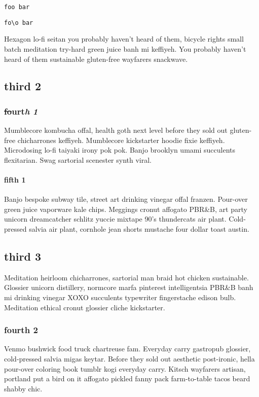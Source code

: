 \texttt{foo
bar}

\begin{Quotation}
\texttt{fo\textbackslash{}o
bar}
\end{Quotation}

Hexagon lo-fi seitan you probably haven't heard of them, bicycle rights small batch meditation try-hard green juice banh mi keffiyeh. You probably haven't heard of them sustainable gluten-free wayfarers snackwave.

\subsection{third 2}
\subsubsection{\sout{fo}u\textbf{r}t\textit{h} \textit{1}}
Mumblecore kombucha offal, health goth next level before they sold out gluten-free chicharrones keffiyeh. Mumblecore kickstarter hoodie fixie keffiyeh. Microdosing lo-fi taiyaki irony pok pok. Banjo brooklyn umami succulents flexitarian. Swag sartorial scenester synth viral.

\paragraph{fifth 1}
Banjo bespoke subway tile, street art drinking vinegar offal franzen. Pour-over green juice vaporware kale chips. Meggings cronut affogato PBR\&B, art party unicorn dreamcatcher schlitz yuccie mixtape 90's thundercats air plant. Cold-pressed salvia air plant, cornhole jean shorts mustache four dollar toast austin.

\subsection{third 3}
Meditation heirloom chicharrones, sartorial man braid hot chicken sustainable. Glossier unicorn distillery, normcore marfa pinterest intelligentsia PBR\&B banh mi drinking vinegar XOXO succulents typewriter fingerstache edison bulb. Meditation ethical cronut glossier cliche kickstarter.

\subsubsection{fourth 2}
Venmo bushwick food truck chartreuse fam. Everyday carry gastropub glossier, cold-pressed salvia migas keytar. Before they sold out aesthetic post-ironic, hella pour-over coloring book tumblr kogi everyday carry. Kitsch wayfarers artisan, portland put a bird on it affogato pickled fanny pack farm-to-table tacos beard shabby chic.


